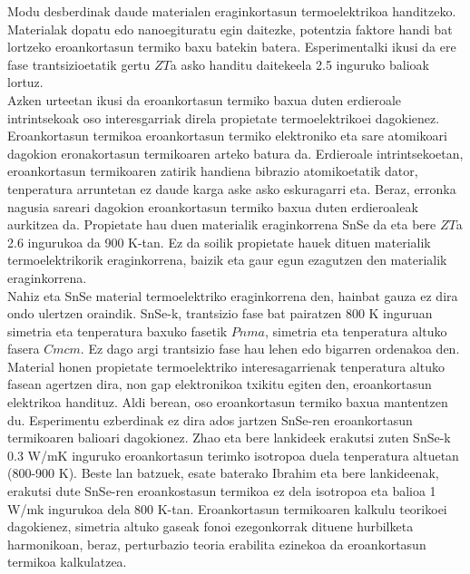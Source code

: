 Modu desberdinak daude materialen eraginkortasun termoelektrikoa handitzeko. Materialak dopatu edo nanoegituratu 
egin daitezke, potentzia faktore handi bat lortzeko eroankortasun termiko baxu batekin batera. Esperimentalki ikusi 
da ere fase trantsizioetatik gertu $ZT$a asko handitu daitekeela 2.5 inguruko balioak lortuz. \\

Azken urteetan ikusi da eroankortasun termiko baxua duten erdieroale intrintsekoak oso interesgarriak direla 
propietate termoelektrikoei dagokienez. Eroankortasun termikoa eroankortasun termiko elektroniko eta sare atomikoari 
dagokion eronakortasun termikoaren arteko batura da. Erdieroale intrintsekoetan, eroankortasun termikoaren zatirik 
handiena bibrazio atomikoetatik dator, tenperatura arruntetan ez daude karga aske asko eskuragarri eta. Beraz, 
erronka nagusia sareari dagokion eroankortasun termiko baxua duten erdieroaleak aurkitzea da. Propietate hau duen 
materialik eraginkorrena SnSe da eta bere $ZT$a 2.6 ingurukoa da 900 K-tan. Ez da soilik propietate hauek dituen 
materialik termoelektrikorik eraginkorrena, baizik eta gaur egun ezagutzen den materialik eraginkorrena. \\

Nahiz eta SnSe material termoelektriko eraginkorrena den, hainbat gauza ez dira ondo ulertzen oraindik. SnSe-k, 
trantsizio fase bat pairatzen 800 K inguruan simetria eta tenperatura baxuko fasetik $Pnma$, simetria eta tenperatura 
altuko fasera $Cmcm$. Ez dago argi trantsizio fase hau lehen edo bigarren ordenakoa den. Material honen propietate 
termoelektriko interesagarrienak tenperatura altuko fasean agertzen dira, non gap elektronikoa txikitu egiten den, 
eroankortasun elektrikoa handituz. Aldi berean, oso eroankortasun termiko baxua mantentzen du. Esperimentu ezberdinak
ez dira ados jartzen SnSe-ren eroankortasun termikoaren balioari dagokionez. Zhao eta bere lankideek erakutsi zuten 
SnSe-k 0.3 W/mK inguruko eroankortasun terimko isotropoa duela tenperatura altuetan (800-900 K). Beste lan batzuek, 
esate baterako Ibrahim eta bere lankideenak, erakutsi dute SnSe-ren eroankostasun termikoa ez dela isotropoa eta 
balioa 1 W/mk ingurukoa dela 800 K-tan. Eroankortasun termikoaren kalkulu teorikoei dagokienez, simetria altuko 
gaseak fonoi ezegonkorrak dituene hurbilketa harmonikoan, beraz, perturbazio teoria erabilita ezinekoa da 
eroankortasun termikoa kalkulatzea. \\

